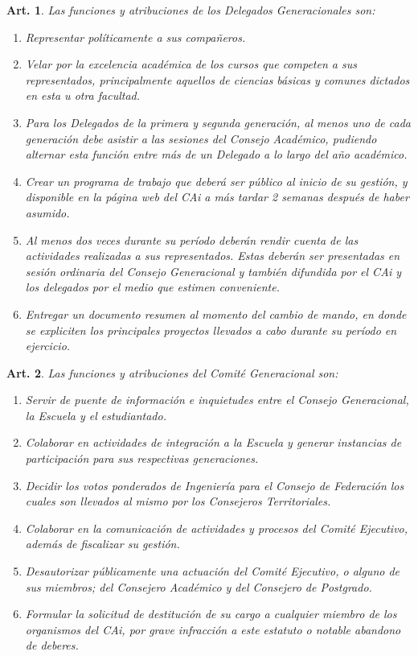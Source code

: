 \documentclass[letterpaper,11pt]{article}
\theoremstyle{plain}
\newtheorem{art}{Art.} %
\begin{document}
		\begin{art}\label{funcionesDelegadosGeneracionales}
			Las funciones y atribuciones de los Delegados Generacionales son:
			\begin{enumerate}
				\item Representar políticamente a sus compañeros.
				\item Velar por la excelencia académica de los cursos que competen a sus representados, principalmente aquellos de ciencias básicas y comunes dictados en esta u otra facultad.
				\item Para los Delegados de la primera y segunda generación, al menos uno de cada generación debe asistir a las sesiones del Consejo Académico, pudiendo alternar esta función entre más de un Delegado a lo largo del año académico.
				\item Crear un programa de trabajo que deberá ser público al inicio de su gestión, y disponible en la página web del CAi a más tardar 2 semanas después de haber asumido.
				\item \label{cuentaPublica} Al menos dos veces durante su período deberán rendir cuenta de las actividades realizadas a sus representados. Estas deberán ser presentadas en sesión ordinaria del Consejo Generacional y también difundida por el CAi  y los delegados por el medio que estimen conveniente.
				\item Entregar un documento resumen al momento del cambio de mando, en donde se expliciten los principales proyectos llevados a cabo durante su período en ejercicio.
			\end{enumerate}
		\end{art}

		\begin{art}\label{funcionesComiteGeneracional}
			Las funciones y atribuciones del Comité Generacional son:
			\begin{enumerate}
				\item Servir de puente de información e inquietudes entre el Consejo Generacional, la Escuela y el estudiantado.
				\item Colaborar en actividades de integración a la Escuela y generar instancias de participación para sus respectivas generaciones.
				\item Decidir los votos ponderados de Ingeniería para el Consejo de Federación los cuales son llevados al mismo por los Consejeros Territoriales.
				\item Colaborar en la comunicación de actividades y procesos del Comité Ejecutivo, además de fiscalizar su gestión.
				\item Desautorizar públicamente una actuación del Comité Ejecutivo, o alguno de sus miembros; del Consejero Académico y del Consejero de Postgrado.
				\item Formular la solicitud de destitución de su cargo a cualquier miembro de los organismos del CAi, por grave infracción a este estatuto o notable abandono de deberes.
			\end{enumerate}
		\end{art}
\end{document}
